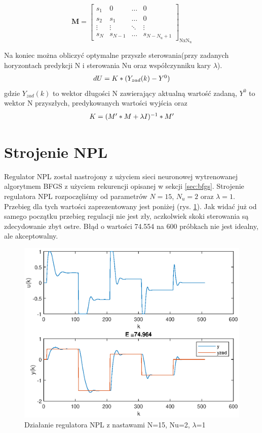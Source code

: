 		\begin{equation}
		\boldsymbol{M}=\left[
		\begin{array}
		{cccc}
		s_{1} & 0 & \ldots & 0\\
		s_{2} & s_{1} & \ldots & 0\\
		\vdots & \vdots & \ddots & \vdots\\
		s_{N} & s_{N-1} & \ldots &  s_{N-N_{\mathrm{u}}+1}
		\end{array}
		\right]_{\mathrm{NxN_u}}
		\label{Mm}
		\end{equation}
		
		Na koniec można obliczyć optymalne przyszłe sterowania(przy zadanych horyzontach predykcji N i sterowania Nu oraz współczynniku kary $\lambda$). 
		\begin{equation}
		\begin{tabular}{l}
		$dU=K*(Y_{zad}(k)-Y^0)$
		\end{tabular}
		\label{eq:NPL_du}
		\end{equation}
		gdzie $Y_{zad}(k)$ to wektor długości N zawierający aktualną wartość zadaną, $Y^0$ to wektor N przyszłych, predykowanych wartości wyjścia oraz
		\begin{equation}
		\begin{tabular}{l}
		$K=(M'*M+\lambda I)^{-1}*M'$
		\end{tabular}
		\label{eq:NPL_K}
		\end{equation}
	
		
		
	\section{Strojenie NPL}
		\label{sec:stroj_NPL}
		Regulator NPL został nastrojony z użyciem sieci neuronowej wytrenowanej algorytmem BFGS z użyciem rekurencji opisanej w sekcji \ref{sec:bfgs}. Strojenie regulatora NPL rozpoczęliśmy od parametrów $N=15$, $N_u=2$ oraz $\lambda=1$. Przebieg dla tych wartości zaprezentowany jest poniżej (rys. \ref{fig:NPL0}). Jak widać już od samego początku przebieg regulacji nie jest zły, aczkolwiek skoki sterowania są zdecydowanie zbyt ostre. Błąd o wartości 74.554 na 600 próbkach nie jest idealny, ale akceptowalny.
		
		\begin{figure}[h!]
			\centering
			\includegraphics[width=0.7\linewidth]{img/strojenieNPL_N_15_Nu_2_lam_1.eps}
			\caption{Działanie regulatora NPL z nastawami N=15, Nu=2, $\lambda$=1}
			\label{fig:NPL0}
		\end{figure}
		
